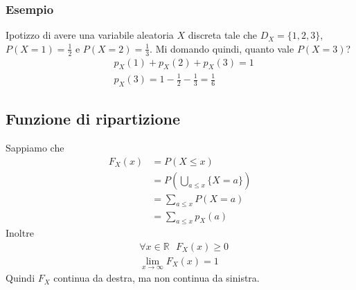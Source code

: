 \documentclass[11pt]{report}
\begin{document}
\subsubsection{Esempio}
Ipotizzo di avere una variabile aleatoria $X$ discreta tale che $D_X = \{1,2,3\}$, $P(X=1) = \frac{1}{2}$ e $P(X=2) = \frac{1}{3}$. Mi domando quindi, quanto vale $P(X=3)$?
\begin{equation}
    \begin{split}
        & p_X(1) + p_X(2) + p_X(3) = 1\\
        & p_X(3) = 1 - \frac{1}{2} - \frac{1}{3} = \frac{1}{6}
    \end{split}
\end{equation}
\begin{center}
    
\end{center}
\subsection{Funzione di ripartizione}
Sappiamo che
\begin{equation}
    \begin{split}
        F_X(x) & = P(X \leq x)\\
        & = P \left( \bigcup_{a \leq x} \{X = a\} \right)\\
        & = \sum_{a \leq x} P(X = a)\\
        & = \sum_{a \leq x} p_X(a)
    \end{split}
\end{equation}
Inoltre
\begin{equation}
    \begin{split}
            & \forall x \in \mathbb{R}\ \ \ F_X(x) \geq 0\\
            & \lim_{x \to \infty} F_X(x) = 1
    \end{split}
\end{equation}
Quindi $F_X$ continua da destra, ma non continua da sinistra.
\end{document}

